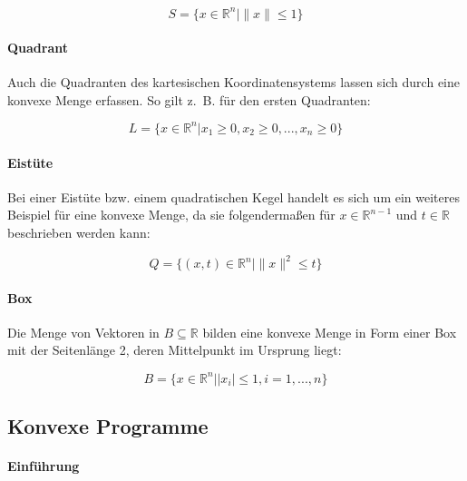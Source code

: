 \begin{equation*}
S = \{x \in \mathbb{R}^{n} | \lVert x \rVert \le 1\}
\end{equation*}

\paragraph{Quadrant}

Auch die Quadranten des kartesischen Koordinatensystems lassen sich durch eine konvexe Menge erfassen. So gilt z.~B. für den ersten Quadranten:

\begin{equation*}
L = \{ x \in \mathbb{R}^{n} | x_1 \ge 0, x_2 \ge 0, ..., x_n \ge 0\}
\end{equation*}

\paragraph{Eistüte}

Bei einer Eistüte bzw. einem quadratischen Kegel handelt es sich um ein weiteres Beispiel für eine konvexe Menge, da sie folgendermaßen für $x \in \mathbb{R}^{n-1}$ und $t \in \mathbb{R}$ beschrieben werden kann:

\begin{equation*}
Q = \{(x, t) \in \mathbb{R}^{n} | \lVert x\rVert ^{2} \le t\}
\end{equation*}

\paragraph{Box}

Die Menge von Vektoren in $B \subseteq \mathbb{R}$ bilden eine konvexe Menge in Form einer Box mit der Seitenlänge 2, deren Mittelpunkt im Ursprung liegt:

\begin{equation*}
B = \{x \in \mathbb{R}^{n} | |x_{i}| \le 1, i = 1, ..., n\}
\end{equation*}

\subsection{Konvexe Programme}

\paragraph{Einführung}


